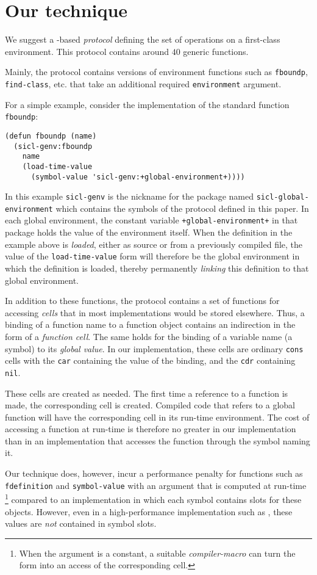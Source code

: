 \section{Our technique}

We suggest a \clos{}-based \emph{protocol} defining the set of
operations on a first-class environment.  This protocol contains
around $40$ generic functions.

Mainly, the protocol contains versions of \commonlisp{} environment
functions such as \texttt{fboundp}, \texttt{find-class}, etc. that
take an additional required \texttt{environment} argument.

For a simple example, consider the \sicl{} implementation of the
standard \commonlisp{} function \texttt{fboundp}:

{\small\begin{verbatim}
(defun fboundp (name)
  (sicl-genv:fboundp
    name
    (load-time-value
      (symbol-value 'sicl-genv:+global-environment+))))
\end{verbatim}}

In this example \texttt{sicl-genv} is the nickname for the package
named \texttt{sicl-global-environment} which contains the symbols of
the protocol defined in this paper.  In each global environment, the
constant variable \texttt{+global-environment+} in that package holds
the value of the environment itself.  When the definition in the
example above is \emph{loaded}, either as source or from a previously
compiled file, the value of the \texttt{load-time-value} form will
therefore be the global environment in which the definition is loaded,
thereby permanently \emph{linking} this definition to that global
environment.

In addition to these functions, the protocol contains a set of
functions for accessing \emph{cells} that in most implementations
would be stored elsewhere.  Thus, a binding of a function name to a
function object contains an indirection in the form of a
\emph{function cell}.  The same holds for the binding of a variable
name (a symbol) to its \emph{global value}.  In our implementation,
these cells are ordinary \texttt{cons} cells with the \texttt{car}
containing the value of the binding, and the \texttt{cdr} containing
\texttt{nil}.

These cells are created as needed.  The first time a reference to a
function is made, the corresponding cell is created.  Compiled code
that refers to a global function will have the corresponding cell in
its run-time environment.  The cost of accessing a function at
run-time is therefore no greater in our implementation than in an
implementation that accesses the function through the symbol naming
it.

Our technique does, however, incur a performance penalty for functions
such as \texttt{fdefinition} and \texttt{symbol-value} with an
argument that is computed at run-time%
\footnote{When the argument is a constant, a suitable
  \emph{compiler-macro} can turn the form into an access of the
  corresponding cell.}
compared to an implementation in which each symbol contains slots for
these objects.  However, even in a high-performance implementation such
as \sbcl{}, these values are \emph{not} contained in symbol slots.
